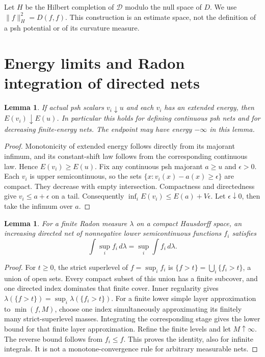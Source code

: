 \documentclass[11pt]{article}
\newtheorem{lemma}[theorem]{Lemma}
\newcommand{\DF}{\mathcal D}
\begin{document}
Let $H$ be the Hilbert completion of $\DF$ modulo the null space of
$D$. We use $\|f\|_H^2=D(f,f)$. This construction is an estimate
space, not the definition of a psh potential or of its curvature
measure.

\section{Energy limits and Radon integration of directed nets}

\begin{lemma}\label{lem:energy}
If actual psh scalars $v_i\downarrow u$ and each $v_i$ has an
extended energy, then $E(v_i)\downarrow E(u)$.
In particular this holds for defining continuous psh nets and for
decreasing finite-energy nets. The endpoint may have energy
$-\infty$ in this lemma.
\end{lemma}
\begin{proof}
Monotonicity of extended energy follows directly from its majorant
infimum, and its constant-shift law follows from the corresponding
continuous law. Hence $E(v_i)\geq E(u)$. Fix any continuous psh
majorant $a\geq u$ and $\epsilon>0$. Each $v_i$ is upper
semicontinuous, so the sets
$\{x:v_i(x)-a(x)\geq\epsilon\}$ are compact. They decrease with
empty intersection. Compactness and directedness give
$v_i\leq a+\epsilon$ on a tail. Consequently
$\inf_iE(v_i)\leq E(a)+V\epsilon$. Let
$\epsilon\downarrow0$, then take the infimum over $a$.
\end{proof}

\begin{lemma}\label{lem:radon}
For a finite Radon measure $\lambda$ on a compact Hausdorff space,
an increasing directed net of nonnegative lower semicontinuous
functions $f_i$ satisfies
\[
 \int\sup_i f_i\,d\lambda=\sup_i\int f_i\,d\lambda.
\]
\end{lemma}
\begin{proof}
For $t\geq0$, the strict superlevel of $f=\sup_i f_i$ is
$\{f>t\}=\bigcup_i\{f_i>t\}$, a union of open sets.
Every compact subset of this union has a finite subcover, and one
directed index dominates that finite cover. Inner regularity gives
$\lambda(\{f>t\})=\sup_i\lambda(\{f_i>t\})$.
For a finite lower simple layer approximation to $\min(f,M)$,
choose one index simultaneously approximating its finitely many
strict-superlevel masses. Integrating the corresponding stage gives
the lower bound for that finite layer approximation. Refine the
finite levels and let $M\uparrow\infty$. The reverse bound follows
from $f_i\leq f$. This proves the identity, also for infinite
integrals. It is not a monotone-convergence rule for arbitrary
measurable nets.
\end{proof}
\end{document}
